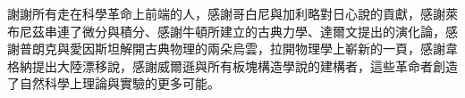 
\begin{acknowledgement}

謝謝所有走在科學革命上前端的人，感謝哥白尼與加利略對日心說的貢獻，感謝萊布尼茲串連了微分與積分、感謝牛頓所建立的古典力學、達爾文提出的演化論，感謝普朗克與愛因斯坦解開古典物理的兩朵烏雲，拉開物理學上嶄新的一頁，感謝韋格納提出大陸漂移說，感謝威爾遜與所有板塊構造學說的建構者，這些革命者創造了自然科學上理論與實驗的更多可能。
  

\end{acknowledgement}